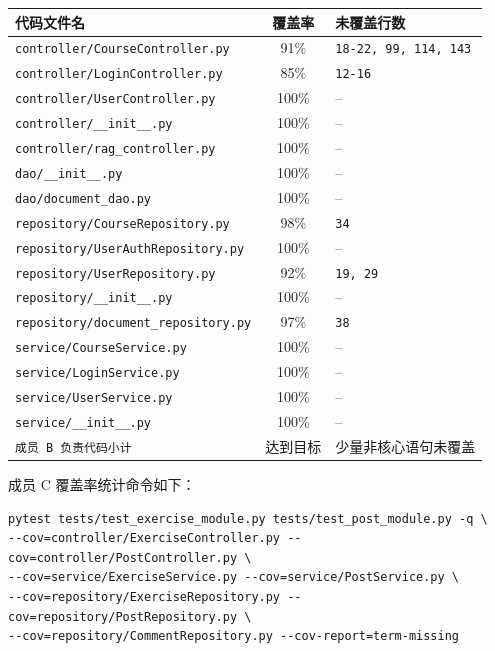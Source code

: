 \documentclass[12pt,a4paper]{ctexart}
\begin{document}
\begin{center}
\begin{tabular}{|p{7.4cm}|c|p{4.3cm}|}
\hline
\textbf{代码文件名} & \textbf{覆盖率} & \textbf{未覆盖行数} \\
\hline
\texttt{controller/CourseController.py} & 91\% & \texttt{18-22, 99, 114, 143} \\
\hline
\texttt{controller/LoginController.py} & 85\% & \texttt{12-16} \\
\hline
\texttt{controller/UserController.py} & 100\% & -- \\
\hline
\texttt{controller/\_\_init\_\_.py} & 100\% & -- \\
\hline
\texttt{controller/rag\_controller.py} & 100\% & -- \\
\hline
\texttt{dao/\_\_init\_\_.py} & 100\% & -- \\
\hline
\texttt{dao/document\_dao.py} & 100\% & -- \\
\hline
\texttt{repository/CourseRepository.py} & 98\% & \texttt{34} \\
\hline
\texttt{repository/UserAuthRepository.py} & 100\% & -- \\
\hline
\texttt{repository/UserRepository.py} & 92\% & \texttt{19, 29} \\
\hline
\texttt{repository/\_\_init\_\_.py} & 100\% & -- \\
\hline
\texttt{repository/document\_repository.py} & 97\% & \texttt{38} \\
\hline
\texttt{service/CourseService.py} & 100\% & -- \\
\hline
\texttt{service/LoginService.py} & 100\% & -- \\
\hline
\texttt{service/UserService.py} & 100\% & -- \\
\hline
\texttt{service/\_\_init\_\_.py} & 100\% & -- \\
\hline
\texttt{成员 B 负责代码小计} & 达到目标 & 少量非核心语句未覆盖 \\
\hline
\end{tabular}
\end{center}

成员 C 覆盖率统计命令如下：

\begin{verbatim}
pytest tests/test_exercise_module.py tests/test_post_module.py -q \
--cov=controller/ExerciseController.py --cov=controller/PostController.py \
--cov=service/ExerciseService.py --cov=service/PostService.py \
--cov=repository/ExerciseRepository.py --cov=repository/PostRepository.py \
--cov=repository/CommentRepository.py --cov-report=term-missing
\end{verbatim}
\end{document}
